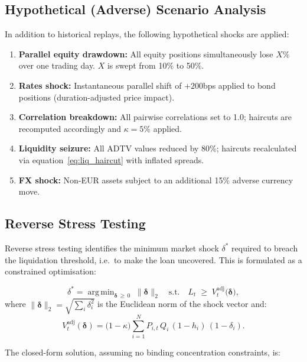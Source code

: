 \documentclass[12pt, a4paper]{article}
\newcommand{\1}{\mathbbm{1}}
\DeclareMathOperator*{\argmin}{arg\,min}
\begin{document}
\subsection{Hypothetical (Adverse) Scenario Analysis}

In addition to historical replays, the following hypothetical shocks are applied:

\begin{enumerate}[leftmargin=1.5em]
    \item \textbf{Parallel equity drawdown:} All equity positions simultaneously
    lose $X\%$ over one trading day. $X$ is swept from 10\% to 50\%.
    \item \textbf{Rates shock:} Instantaneous parallel shift of $+200$bps applied
    to bond positions (duration-adjusted price impact).
    \item \textbf{Correlation breakdown:} All pairwise correlations set to 1.0;
    haircuts are recomputed accordingly and $\kappa = 5\%$ applied.
    \item \textbf{Liquidity seizure:} All ADTV values reduced by 80\%; haircuts
    recalculated via equation~\eqref{eq:liq_haircut} with inflated spreads.
    \item \textbf{FX shock:} Non-EUR assets subject to an additional 15\% adverse
    currency move.
\end{enumerate}

\subsection{Reverse Stress Testing}
\label{subsec:reverse_stress}

Reverse stress testing identifies the minimum market shock $\delta^*$ required
to breach the liquidation threshold, i.e.\ to make the loan uncovered. This is
formulated as a constrained optimisation:

\begin{equation}
    \delta^* = \argmin_{\boldsymbol{\delta}\,\geq\,0}
    \;\|\boldsymbol{\delta}\|_2
    \quad\text{s.t.}\quad
    L_t \;\geq\; V_t^{\mathrm{adj}}\bigl(\boldsymbol{\delta}\bigr),
    \label{eq:reverse_stress}
\end{equation}
where $\|\boldsymbol{\delta}\|_2 = \sqrt{\sum_i \delta_i^2}$ is the Euclidean
norm of the shock vector and:
\[
V_t^{\mathrm{adj}}(\boldsymbol{\delta})
= \bigl(1 - \kappa\bigr)
\sum_{i=1}^{N} P_{i,t}\,Q_i\,(1-h_i)\,(1-\delta_i).
\]

\noindent The closed-form solution, assuming no binding concentration constraints, is:
\end{document}
